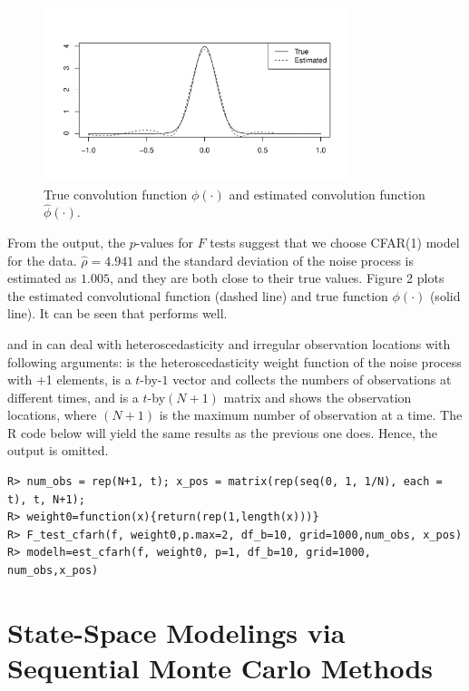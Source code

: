 \begin{figure}[t!]
\centering
\includegraphics[width=3.5in]{article-cfar_plot}
\caption{True convolution function $\phi(\cdot)$ and estimated convolution function $\hat{\phi}(\cdot)$.}
\end{figure}



From the output, the $p$-values for $F$ tests suggest that we choose CFAR(1) model for the data. $\hat{\rho}=4.941$ and the standard deviation of the noise process is estimated as $1.005$, and they are both close to their true values.
 Figure 2 plots the estimated convolutional function (dashed line) and true function $\phi(\cdot)$ (solid line). It can be seen that  performs well.
 
 
 and  in  can deal with heteroscedasticity and irregular observation locations with following arguments:  is the heteroscedasticity weight function of the noise process with +1 elements,  is a $t$-by-$1$ vector and collects the numbers of observations at different times, and  is a $t$-by$(N+1)$ matrix and shows the observation locations, where $(N+1)$ is the maximum number of observation at a time. The R code below will yield the same results as the previous one does. Hence, the output is omitted.
\begin{verbatim}
R> num_obs = rep(N+1, t); x_pos = matrix(rep(seq(0, 1, 1/N), each = t), t, N+1);
R> weight0=function(x){return(rep(1,length(x)))}
R> F_test_cfarh(f, weight0,p.max=2, df_b=10, grid=1000,num_obs, x_pos)
R> modelh=est_cfarh(f, weight0, p=1, df_b=10, grid=1000, num_obs,x_pos)
\end{verbatim}


\section[State-Space Modelings via Sequential Monte Carlo Methods] {State-Space Modelings via Sequential Monte Carlo Methods}




